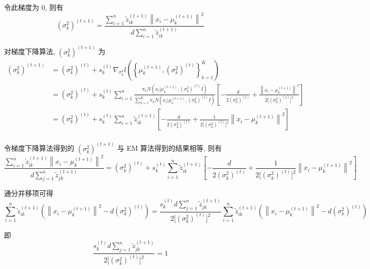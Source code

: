 \documentclass{article}
\begin{document}
令此梯度为 0, 则有
\begin{equation}
  (\sigma_k^2)^{(t+1)}=\frac{\displaystyle\sum_{i=1}^n\tilde{z}_{ik}^{(t+1)}\left\|x_i-\mu_k^{(t+1)}\right\|^2}{\displaystyle d\sum_{i=1}^n\tilde{z}_{ik}^{(t+1)}}
\end{equation}

对梯度下降算法, $(\sigma_k^2)^{(t+1)}$ 为
\begin{equation}
  \begin{aligned}
    (\sigma_k^2)^{(t+1)}
    &=(\sigma_k ^2)^{(t)}+s_k^{(t)}\nabla_{\sigma_k^2}l\left(\left\{\mu_k^{(t+1)},(\sigma_k^2)^{(t)}\right\}_{k=1}^K\right)\\
    &=(\sigma_k^2)^{(t)}+s_k^{(t)}\sum_{i=1}^n \frac{\pi_k N\left(x_i\Big|\mu_k^{(t+1)},(\sigma_k^2)^{(t)}I\right)}{\displaystyle\sum_{k=1}^K\pi_k N\left(x_i\Big|\mu_k^{(t+1)},(\sigma_k^2)^{(t)}I\right)}\left[-\frac{d}{2(\sigma_k^2)^{(t)}}+\frac{\left\|x_i-\mu_k^{(t+1)}\right\|^2}{2\big[(\sigma_k^2)^{(t)}\big]^2}\right]\\
    &=(\sigma_k ^2)^{(t)}+s_k^{(t)}\sum_{i=1}^n \tilde{z}_{ik}^{(t+1)}\left[-\frac{d}{2(\sigma_k^2)^{(t)}}+\frac{1}{2\big[(\sigma_k^2)^{(t)}\big]^2}\left\|x_i-\mu_k^{(t+1)}\right\|^2\right]\\
  \end{aligned}
\end{equation}

令梯度下降算法得到的 $(\sigma_k^2)^{(t+1)}$ 与 EM 算法得到的结果相等, 则有
\begin{equation}
  \frac{\displaystyle\sum_{i=1}^n\tilde{z}_{ik}^{(t+1)}\left\|x_i-\mu_k^{(t+1)}\right\|^2}{\displaystyle d\sum_{j=1}^n\tilde{z}_{jk}^{(t+1)}}
  =(\sigma_k ^2)^{(t)}+s_k^{(t)}\sum_{i=1}^n \tilde{z}_{ik}^{(t+1)}\left[-\frac{d}{2(\sigma_k^2)^{(t)}}+\frac{1}{2\big[(\sigma_k^2)^{(t)}\big]^2}\left\|x_i-\mu_k^{(t+1)}\right\|^2\right]
\end{equation}

通分并移项可得
\begin{equation}
  \sum_{i=1}^n\tilde{z}_{ik}^{(t+1)}\left(\left\|x_i-\mu_k^{(t+1)}\right\|^2-d(\sigma_k ^2)^{(t)}\right)
  =\frac{\displaystyle s_k^{(t)}d\sum_{j=1}^n\tilde{z}_{jk}^{(t+1)}}{2\big[(\sigma_k^2)^{(t)}\big]^2}\sum_{i=1}^n\tilde{z}_{ik}^{(t+1)}\left(\left\|x_i-\mu_k^{(t+1)}\right\|^2-d(\sigma_k ^2)^{(t)}\right)
\end{equation}

即
\begin{equation}
  \frac{\displaystyle s_k^{(t)}d\sum_{j=1}^n\tilde{z}_{jk}^{(t+1)}}{2\big[(\sigma_k^2)^{(t)}\big]^2}=1
\end{equation}
\end{document}
